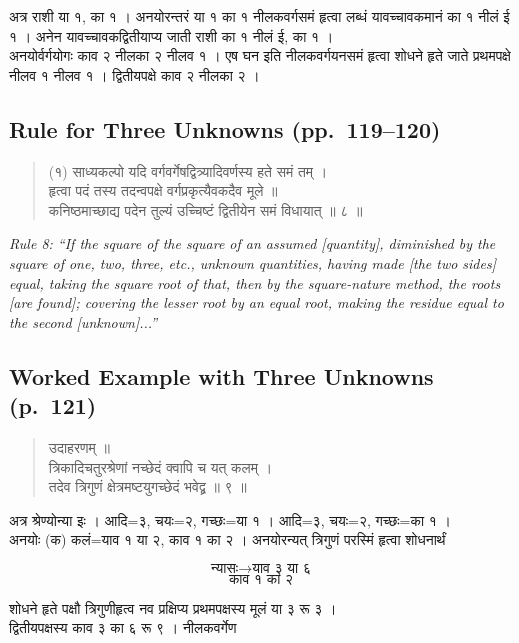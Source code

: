 \documentclass[11pt,a4paper]{article}
\newcommand{\cnote}[1]{\textcolor{notecolor}{\textit{#1}}}
\newcommand{\dev}[1]{{\devanagarifont #1}}
\newenvironment{sanskritverse}{%
  \begin{verse}
}{%
  \end{verse}
}
\begin{document}
\dev{%
अत्र राशी या १, का १ । अनयोरन्तरं या १ का १ नीलकवर्गसमं हृत्वा लब्धं यावच्चावकमानं का १ नीलं ई १ । अनेन यावच्चावकद्वितीयाप्य जाती राशी का १ नीलं ई, का १ ।\\
अनयोर्वर्गयोगः काव २ नीलका २ नीलव १ । एष घन इति नीलकवर्गयनसमं हृत्वा शोधने हृते जाते प्रथमपक्षे नीलव १ नीलव १ । द्वितीयपक्षे काव २ नीलका २ ।}

\subsection*{Rule for Three Unknowns (pp.\ 119--120)}

\begin{sanskritverse}
\dev{%
(१) साध्यकल्पो यदि वर्गवर्गेषद्वित्र्यादिवर्णस्य हते समं तम् ।\\
हृत्वा पदं तस्य तदन्वपक्षे वर्गप्रकृत्यैवकदैव मूले ॥\\
कनिष्ठमाच्छाद्य पदेन तुल्यं उच्चिष्टं द्वितीयेन समं विधायात् ॥ ८ ॥}
\end{sanskritverse}

\cnote{Rule 8: ``If the square of the square of an assumed [quantity], diminished by the square of one, two, three, etc., unknown quantities, having made [the two sides] equal, taking the square root of that, then by the square-nature method, the roots [are found]; covering the lesser root by an equal root, making the residue equal to the second [unknown]...''}

\subsection*{Worked Example with Three Unknowns (p.\ 121)}

\begin{sanskritverse}
\dev{%
उदाहरणम् ॥\\[0.3em]
त्रिकादिचतुरश्रेणां नच्छेदं क्वापि च यत् कलम् ।\\
तदेव त्रिगुणं क्षेत्रमष्टयुगच्छेदं भवेद्व्र ॥ ९ ॥}
\end{sanskritverse}

\dev{%
अत्र श्रेण्योन्या इः । आदि=३, चयः=२, गच्छः=या १ । आदि=३, चयः=२, गच्छः=का १ ।\\
अनयोः (क) कलं=याव १ या २, काव १ का २ । अनयोरन्यत् त्रिगुणं परस्मिं हृत्वा शोधनार्थं}

$$\text{न्यासः} \longrightarrow \text{याव ३ या ६}$$
$$\text{काव १ का २}$$

\dev{%
शोधने हृते पक्षौ त्रिगुणीहृत्व नव प्रक्षिप्य प्रथमपक्षस्य मूलं या ३ रू ३ ।\\
द्वितीयपक्षस्य काव ३ का ६ रू ९ । नीलकवर्गेण}
\end{document}

